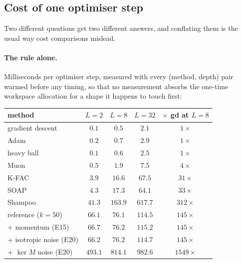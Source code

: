 \documentclass{article} %
\theoremstyle{plain}
\theoremstyle{definition}
\theoremstyle{remark}
\begin{document}
\subsection{Cost of one optimiser step}

Two different questions get two different answers, and conflating them is the usual way cost
comparisons mislead.

\paragraph{The rule alone.} Milliseconds per optimiser step, measured with every
(method, depth) pair warmed before any timing, so that no measurement absorbs the one-time
workspace allocation for a shape it happens to touch first:

\begin{center}\small
\begin{tabular}{lcccc}
\toprule
method & $L=2$ & $L=8$ & $L=32$ & $\times$ gd at $L=8$ \\
\midrule
gradient descent      & $0.1$  & $0.5$   & $2.1$   & $1\times$ \\
Adam                  & $0.2$  & $0.7$   & $2.9$   & $1\times$ \\
heavy ball            & $0.1$  & $0.6$   & $2.5$   & $1\times$ \\
Muon                  & $0.5$  & $1.9$   & $7.5$   & $4\times$ \\
K-FAC                 & $3.9$  & $16.6$  & $67.5$  & $31\times$ \\
SOAP                  & $4.3$  & $17.3$  & $64.1$  & $33\times$ \\
Shampoo               & $41.3$ & $163.9$ & $617.7$ & $312\times$ \\
\midrule
reference ($k=50$)    & $66.1$ & $76.1$  & $114.5$ & $145\times$ \\
\; + momentum (E15)   & $66.7$ & $76.2$  & $115.2$ & $145\times$ \\
\; + isotropic noise (E20) & $66.2$ & $76.2$ & $114.7$ & $145\times$ \\
\; + $\ker M$ noise (E20)  & $493.1$ & $814.1$ & $982.6$ & $1549\times$ \\
\bottomrule
\end{tabular}
\end{center}
\end{document}

